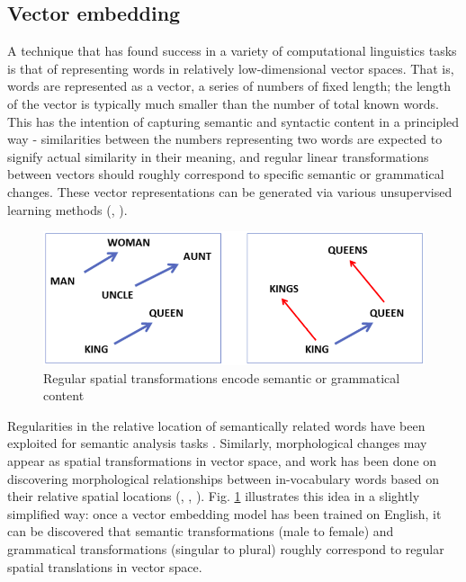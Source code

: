 \subsection{Vector embedding}

A technique that has found success in a variety of computational linguistics tasks is that of representing words in relatively low-dimensional vector spaces. That is, words are represented as a vector, a series of numbers of fixed length; the length of the vector is typically much smaller than the number of total known words. This has the intention of capturing semantic and syntactic content in a principled way - similarities between the numbers representing two words are expected to signify actual similarity in their meaning, and regular linear transformations between vectors should roughly correspond to specific semantic or grammatical changes. These vector representations can be generated via various unsupervised learning methods (\cite{Bilmes2003}, \cite{Alexandrescu2006}).

\begin{figure}[ht]
\includegraphics[width=12cm]{images/semantic_transform.png}
\centering
\caption{Regular spatial transformations encode semantic or grammatical content \parencite{Mikolov2013}}
\label{fig:vectors}
\end{figure}

Regularities in the relative location of semantically related words have been exploited for semantic analysis tasks \parencite{Alexandrescu2006}. Similarly, morphological changes may appear as spatial transformations in vector space, and work has been done on discovering morphological relationships between in-vocabulary words based on their relative spatial locations (\cite{Mikolov2013}, \cite{Soricut2015}, \cite{DosSantos2014}). Fig. \ref{fig:vectors}  illustrates this idea in a slightly simplified way: once a vector embedding model has been trained on English, it can be discovered that semantic transformations (male to female) and grammatical transformations (singular to plural) roughly correspond to regular spatial translations in vector space.

